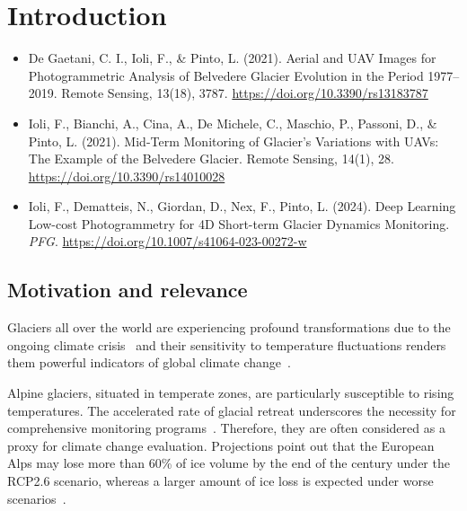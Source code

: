 \graphicspath{{figures/chapter1/}}
\onehalfspacing

\chapter{Introduction}\label{ch:introduction}
\label{introduction}

\vfill


\noindent 

\begin{itemize}
    \item De Gaetani, C. I., Ioli, F., \& Pinto, L. (2021). Aerial and UAV Images for Photogrammetric Analysis of Belvedere Glacier Evolution in the Period 1977–2019. Remote Sensing, 13(18), 3787. \url{https://doi.org/10.3390/rs13183787}
    \item Ioli, F., Bianchi, A., Cina, A., De Michele, C., Maschio, P., Passoni, D., \& Pinto, L. (2021). Mid-Term Monitoring of Glacier’s Variations with UAVs: The Example of the Belvedere Glacier. Remote Sensing, 14(1), 28. \url{https://doi.org/10.3390/rs14010028}
    \item Ioli, F., Dematteis, N., Giordan, D., Nex, F., Pinto, L. (2024). Deep Learning Low-cost Photogrammetry for 4D Short-term Glacier Dynamics Monitoring. \textit{PFG}. \url{https://doi.org/10.1007/s41064-023-00272-w}
\end{itemize}

\newpage

\section{Motivation and relevance}

Glaciers all over the world are experiencing profound transformations due to the ongoing climate crisis~\citep{Oerlemans2005} and their sensitivity to temperature fluctuations renders them powerful indicators of global climate change~\citep{Barry2016}.

Alpine glaciers, situated in temperate zones, are particularly susceptible to rising temperatures. The accelerated rate of glacial retreat underscores the necessity for comprehensive monitoring programs~\citep{Zemp2006,Sommer2020}. 
Therefore, they are often considered as a proxy for climate change evaluation.
Projections point out that the European Alps may lose more than 60\% of ice volume by the end of the century under the RCP2.6 scenario, whereas a larger amount of ice loss is expected under worse scenarios~\citep{Zekollari2019}.

